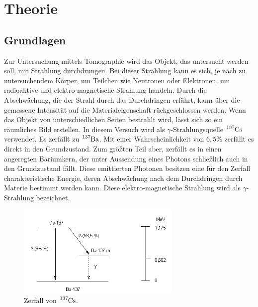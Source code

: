 \section{Theorie}
\subsection{Grundlagen}
Zur Untersuchung mittels Tomographie wird das Objekt, das untersucht werden soll, mit Strahlung durchdrungen.
Bei dieser Strahlung kann es sich, je nach zu untersuchendem Körper, um Teilchen wie Neutronen oder Elektronen, um radioaktive und elektro-magnetische Strahlung handeln.
Durch die Abschwächung, die der Strahl durch das Durchdringen erfährt, kann über die gemessene Intensität auf die Materialeigenschaft rückgeschlossen werden.
Wenn das Objekt von unterschiedlichen Seiten bestrahlt wird, lässt sich so ein räumliches Bild erstellen.
In diesem Versuch wird als $\gamma$-Strahlungsquelle $\ce{^{137}Cs}$ verwendet. Es zerfällt zu $\ce{^{137}Ba}$.
Mit einer Wahrscheinlichkeit von $6,5 \%$ zerfällt es direkt in den Grundzustand.
Zum größten Teil aber, zerfällt es in einen angeregten Bariumkern, der unter Aussendung eines Photons schließlich auch in den Grundzustand fällt.
Diese emittierten Photonen besitzen eine für den Zerfall charakteristische Energie, deren Abschwächung nach dem Durchdringen durch Materie bestimmt werden kann.
Diese elektro-magnetische Strahlung wird als $\gamma$-Strahlung bezeichnet.
\begin{figure}[H]
  \centering
  \includegraphics[width=0.7\textwidth]{Bilder/caesium.png}
  \caption{Zerfall von $\ce{^{137}Cs}$.\cite{caesium}}
  \label{fig:caesium}
\end{figure}


